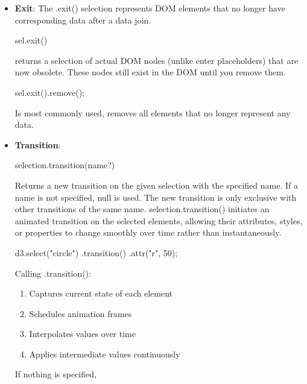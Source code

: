 \documentclass{report}
\begin{document}
\begin{itemize}
        \item \textbf{Exit}: The .exit() selection represents DOM elements that no longer have corresponding data after a data join.
            \bigbreak \noindent 
            \begin{jscode}
                sel.exit()
            \end{jscode}
            \bigbreak \noindent 
            returns a selection of actual DOM nodes (unlike enter placeholders) that are now obsolete. These nodes still exist in the DOM until you remove them.
            \bigbreak \noindent 
            \begin{jscode}
            sel.exit().remove();
            \end{jscode}
            \bigbreak \noindent 
            Is most commonly used, removes all elements that no longer represent any data.
        \item \textbf{Transition}:
            \bigbreak \noindent 
            \begin{jscode}
                selection.transition(name?)
            \end{jscode}
            \bigbreak \noindent 
            Returns a new transition on the given selection with the specified name. If a name is not specified, null is used. The new transition is only exclusive with other transitions of the same name.
            \bigbreak \noindent 
            selection.transition() initiates an animated transition on the selected elements, allowing their attributes, styles, or properties to change smoothly over time rather than instantaneously.
            \bigbreak \noindent 
            \begin{jscode}
                d3.select("circle")
                    .transition()
                    .attr("r", 50);
            \end{jscode}
            \bigbreak \noindent 
            Calling .transition():
            \begin{enumerate}
                \item Captures current state of each element
                \item Schedules animation frames
                \item Interpolates values over time
                \item Applies intermediate values continuously
            \end{enumerate}
            If nothing is specified, 
            \begin{itemize}

\end{itemize}
\end{itemize}
\end{document}
